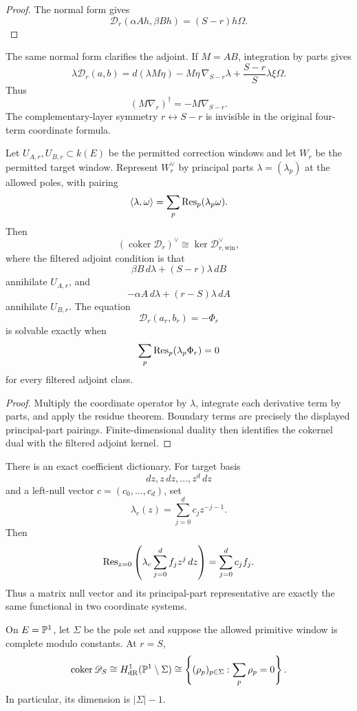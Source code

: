 \begin{proof}
The normal form gives
\[
\mathscr D_r(\alpha Ah,\beta Bh)=(S-r)h\Omega.
\]
\end{proof}

The same normal form clarifies the adjoint.  If \(M=AB\), integration by
parts gives
\[
\lambda\mathscr D_r(a,b)
=d(\lambda M\eta)
-M\eta\,\nabla_{S-r}\lambda
+\frac{S-r}{S}\lambda\xi\Omega.
\]
Thus
\[
(M\nabla_r)^\dagger=-M\nabla_{S-r}.
\]
The complementary-layer symmetry \(r\leftrightarrow S-r\) is invisible in
the original four-term coordinate formula.

\begin{theorem}
\label{thm:filtered-residue-adjoint}
Let \(U_{A,r},U_{B,r}\subset k(E)\) be the permitted correction windows and
let \(W_r\) be the permitted target window.  Represent \(W_r^\vee\) by
principal parts \(\lambda=(\lambda_p)\) at the allowed poles, with pairing
\[
\langle\lambda,\omega\rangle
=\sum_p\operatorname{Res}_p(\lambda_p\omega).
\]
Then
\[
(\operatorname{coker}\mathscr D_r)^\vee
\cong\ker\mathscr D_{r,\mathrm{win}}^\vee,
\]
where the filtered adjoint condition is that
\[
\beta B\,d\lambda+(S-r)\lambda\,dB
\]
annihilate \(U_{A,r}\), and
\[
-\alpha A\,d\lambda+(r-S)\lambda\,dA
\]
annihilate \(U_{B,r}\).  The equation
\[
\mathscr D_r(a_r,b_r)=-\Phi_r
\]
is solvable exactly when
\[
\sum_p\operatorname{Res}_p(\lambda_p\Phi_r)=0
\]
for every filtered adjoint class.
\end{theorem}

\begin{proof}
Multiply the coordinate operator by \(\lambda\), integrate each derivative
term by parts, and apply the residue theorem.  Boundary terms are precisely
the displayed principal-part pairings.  Finite-dimensional duality then
identifies the cokernel dual with the filtered adjoint kernel.
\end{proof}

There is an exact coefficient dictionary.  For target basis
\[
dz,z\,dz,\ldots,z^d\,dz
\]
and a left-null vector \(c=(c_0,\ldots,c_d)\), set
\[
\lambda_c(z)=\sum_{j=0}^dc_jz^{-j-1}.
\]
Then
\[
\operatorname{Res}_{z=0}\left(
\lambda_c\sum_{j=0}^df_jz^j\,dz
\right)=\sum_{j=0}^dc_jf_j.
\]
Thus a matrix null vector and its principal-part representative are exactly
the same functional in two coordinate systems.

\begin{corollary}
\label{cor:resonant-de-rham}
On \(E=\mathbb P^1\), let \(\Sigma\) be the pole set and suppose the allowed
primitive window is complete modulo constants.  At \(r=S\),
\[
\operatorname{coker}\mathscr D_S
\cong
H^1_{\mathrm{dR}}(\mathbb P^1\setminus\Sigma)
\cong
\left\{(\rho_p)_{p\in\Sigma}:\sum_p\rho_p=0\right\}.
\]
In particular, its dimension is \(|\Sigma|-1\).
\end{corollary}

